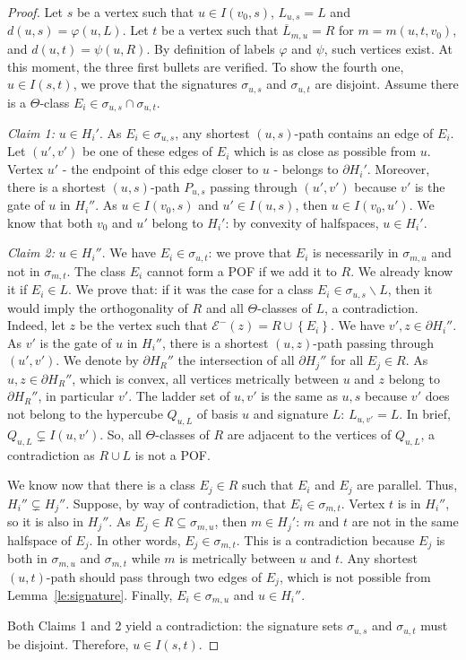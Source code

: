 \documentclass[a4paper,UKenglish,numberwithinsect,cleveref, autoref,anonymous]{lipics-v2021}
\newcommand{\set}[1]{\left\{ #1 \right\}}
\begin{document}
\begin{proof}
Let $s$ be a vertex such that $u \in I(v_0,s)$, $L_{u,s} = L$ and $d(u,s) = \varphi(u,L)$. Let $t$ be a vertex such that $\overline{L}_{m,u} = R$ for $m = m(u,t,v_0)$, and $d(u,t) = \psi(u,R)$.
By definition of labels $\varphi$ and $\psi$, such vertices exist.
At this moment, the three first bullets are verified.
To show the fourth one, $u \in I(s,t)$, we prove that the signatures $\sigma_{u,s}$ and $\sigma_{u,t}$ are disjoint. Assume there is a $\Theta$-class $E_i \in \sigma_{u,s} \cap \sigma_{u,t}$.

\textit{Claim 1:} $u \in H_i'$.
As $E_i \in \sigma_{u,s}$, any shortest $(u,s)$-path contains an edge of $E_i$. Let $(u',v')$ be one of these edges of $E_i$ which is as close as possible from $u$. Vertex $u'$ - the endpoint of this edge closer to $u$ - belongs to $\partial H_i'$. Moreover, there is a shortest $(u,s)$-path $P_{u,s}$ passing through $(u',v')$ because $v'$ is the gate of $u$ in $H_i''$. As $u \in I(v_0,s)$ and $u' \in I(u,s)$, then $u \in I(v_0,u')$. We know that both $v_0$ and $u'$ belong to $H_i'$: by convexity of halfspaces, $u \in H_i'$. 

\textit{Claim 2:} $u \in H_i''$. We have $E_i \in \sigma_{u,t}$: we prove that $E_i$ is necessarily in $\sigma_{m,u}$ and not in $\sigma_{m,t}$. The class $E_i$ cannot form a POF if we add it to $R$. We already know it if $E_i \in L$. We prove that: if it was the case for a class $E_i \in \sigma_{u,s} \backslash L$, then it would imply the orthogonality of $R$ and all $\Theta$-classes of $L$, a contradiction. Indeed, let $z$ be the vertex such that $\mathcal{E}^-(z) = R \cup \set{E_i}$. We have $v',z \in \partial H_i''$. As $v'$ is the gate of $u$ in $H_i''$, there is a shortest $(u,z)$-path passing through $(u',v')$. We denote by $\partial H_R''$ the intersection of all $\partial H_j''$ for all $E_j \in R$. As $u,z \in \partial H_R''$, which is convex, all vertices metrically between $u$ and $z$ belong to $\partial H_R''$, in particular $v'$. The ladder set of $u,v'$ is the same as $u,s$ because $v'$ does not belong to the hypercube $Q_{u,L}$ of basis $u$ and signature $L$: $L_{u,v'} = L$. In brief, $Q_{u,L} \subsetneq I(u,v')$. So, all $\Theta$-classes of $R$ are adjacent to the vertices of $Q_{u,L}$, a contradiction as $R \cup L$ is not a POF.
 
We know now that there is a class $E_j \in R$ such that $E_i$ and $E_j$ are parallel. Thus, $H_i'' \subsetneq H_j''$. Suppose, by way of contradiction, that $E_i \in \sigma_{m,t}$. Vertex $t$ is in $H_i''$, so it is also in $H_j''$. As $E_j \in R \subseteq \sigma_{m,u}$, then $m \in H_j'$: $m$ and $t$ are not in the same halfspace of $E_j$. In other words, $E_j \in \sigma_{m,t}$. This is a contradiction because $E_j$ is both in $\sigma_{m,u}$ and $\sigma_{m,t}$ while $m$ is metrically between $u$ and $t$. Any shortest $(u,t)$-path should pass through two edges of $E_j$, which is not possible from Lemma~\ref{le:signature}. Finally, $E_i \in \sigma_{m,u}$ and $u \in H_i''$.

Both Claims 1 and 2 yield a contradiction: the signature sets $\sigma_{u,s}$ and $\sigma_{u,t}$ must be disjoint. Therefore, $u \in I(s,t)$.
\end{proof}
\end{document}

